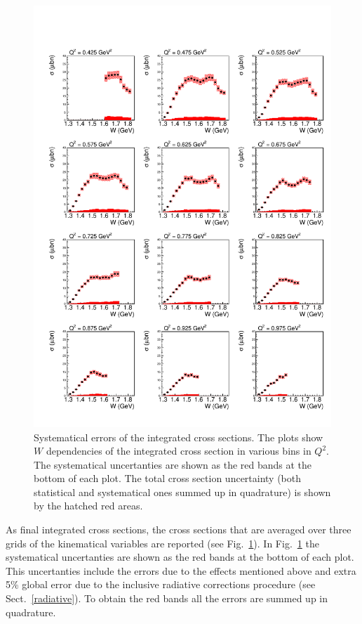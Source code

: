 \begin{figure}[htp]
\begin{center}
\includegraphics[width=15cm]{pictures/sys_err/sys_err.pdf}
\caption{\small Systematical errors of the integrated cross sections. The plots show $W$ dependencies of the integrated cross section in various bins in $Q^{2}$. The systematical uncertanties are shown as the red bands at the bottom of each plot. The total cross section uncertainty (both statistical and systematical ones summed up in quadrature) is shown by the hatched red areas.}
\label{fig:sys_err}

\end{center}
\end{figure}

As final integrated cross sections, the cross sections that are averaged over three grids of the kinematical variables are reported (see Fig.~\ref{fig:sys_err}). In Fig.~\ref{fig:sys_err} the systematical uncertanties are shown as the red bands at the bottom of each plot. This uncertanties include the errors due to the effects mentioned above and extra 5\% global error due to the inclusive radiative corrections procedure (see Sect.~\ref{radiative}). To obtain the red bands all the errors are summed up in quadrature.  

